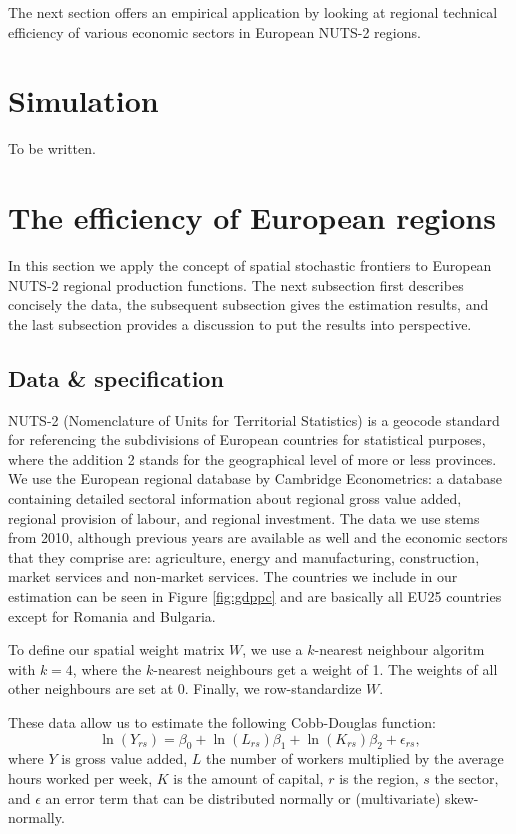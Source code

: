 \documentclass[11pt,parskip,abstracton,notitlepage]{scrartcl}
\begin{document}
The next section offers an empirical application by looking at regional technical efficiency of various economic sectors in European NUTS-2 regions.
%
\section{Simulation}

To be written.

\section{The efficiency of European regions\label{sec:Applications}}
%
In this section we apply the concept of spatial stochastic frontiers to European NUTS-2 regional production functions. The next subsection first describes concisely the data, the subsequent subsection gives the estimation results, and the last subsection provides a discussion to put the results into perspective. 
%
\subsection{Data \& specification}
%
NUTS-2 (Nomenclature of Units for Territorial Statistics) is a geocode standard for referencing the subdivisions of European countries for statistical purposes, where the addition 2 stands for the geographical level of more or less provinces. We use the European regional database by Cambridge Econometrics: a database containing detailed sectoral information about regional gross value added, regional provision of labour, and regional investment. The data we use stems from 2010, although previous years are available as well and the economic sectors that they comprise are: agriculture, energy and manufacturing, construction, market services and non-market services. The countries we include in our estimation can be seen in Figure \ref{fig:gdppc} and are basically all EU25 countries except for Romania and Bulgaria. 

To define our spatial weight matrix $W$, we use a $k$-nearest neighbour algoritm with $k = 4$, where the $k$-nearest neighbours get a weight of 1. The weights of all other neighbours are set at 0. Finally, we row-standardize $W$. 

These data allow us to estimate the following Cobb-Douglas function:
\begin{equation}
\ln \left(Y_{rs}\right) = \beta_0 + \ln({L}_{rs}) \beta_1 + \ln({K}_{rs})\beta_2 + \epsilon_{rs},
\label{eq:CD}
\end{equation}
where $Y$ is gross value added, $L$ the number of workers multiplied by the average hours worked per week, $K$ is the amount of capital, $r$ is the region, $s$ the sector, and $\epsilon$ an error term that can be distributed normally or (multivariate) skew-normally.
\end{document}

